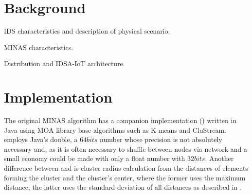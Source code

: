 \documentclass[conference]{IEEEtran}
\begin{document}
\section{Background}

IDS characteristics and description of physical scenario.



MINAS characteristics.

Distribution and IDSA-IoT architecture.

\section{Implementation}

The original MINAS algorithm has a companion implementation ()
written in Java using MOA library base algorithms such as K-means and CluStream.
 employs Java's double, a $64 bits$ number whose precision is not
absolutely necessary and, as it is often necessary to shuffle between nodes via
network and a small economy could be made with only a float number with $32 bits$.
Another difference between  and \mfog is cluster radius calculation
from the distances of elements forming the cluster and the cluster's center,
where the former uses the maximum distance, the latter uses the standard deviation
of all distances as described in
\cite{Faria2016minas}.

\end{document}
